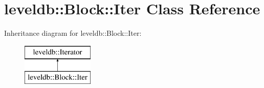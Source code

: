 \hypertarget{classleveldb_1_1_block_1_1_iter}{}\section{leveldb\+:\+:Block\+:\+:Iter Class Reference}
\label{classleveldb_1_1_block_1_1_iter}
Inheritance diagram for leveldb\+:\+:Block\+:\+:Iter\+:\begin{figure}[H]
\begin{center}
\leavevmode
\includegraphics[height=2.000000cm]{classleveldb_1_1_block_1_1_iter}
\end{center}
\end{figure}
